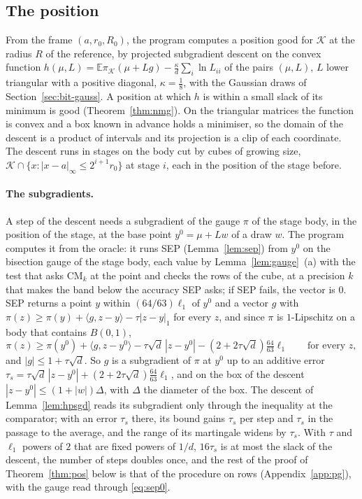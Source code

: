 \documentclass[11pt]{amsart}
\theoremstyle{definition}
\numberwithin{equation}{section}
\newcommand{\E}{\mathbb{E}}
\newcommand{\cK}{\mathcal{K}}
\newcommand{\ip}[1]{\langle #1\rangle}
\begin{document}
\subsection{The position}\label{sec:bit-pos}

From the frame $(a,r_0,R_0)$, the program computes a position good for $\cK$ at the radius $R$ of the reference, by projected subgradient descent on the convex function $h(\mu,L)=\E\pi_\cK(\mu+Lg)-\frac\kappa d\sum_i\ln L_{ii}$ of the pairs $(\mu,L)$, $L$ lower triangular with a positive diagonal, $\kappa=\frac18$, with the Gaussian draws of Section~\ref{sec:bit-gauss}. A position at which $h$ is within a small slack of its minimum is good (Theorem~\ref{thm:nmg}). On the triangular matrices the function is convex and a box known in advance holds a minimiser, so the domain of the descent is a product of intervals and its projection is a clip of each coordinate. The descent runs in stages on the body cut by cubes of growing size, $\cK\cap\{x:|x-a|_\infty\le2^{i+1}r_0\}$ at stage $i$, each in the position of the stage before.

\paragraph{The subgradients.} A step of the descent needs a subgradient of the gauge $\pi$ of the stage body, in the position of the stage, at the base point $y^0=\mu+Lw$ of a draw $w$. The program computes it from the oracle: it runs SEP (Lemma~\ref{lem:sep}) from $y^0$ on the bisection gauge of the stage body, each value by Lemma~\ref{lem:gauge}~(a) with the test that asks $\mathrm{CM}_k$ at the point and checks the rows of the cube, at a precision $k$ that makes the band below the accuracy SEP asks; if SEP fails, the vector is $0$. SEP returns a point $y$ within $(64/63)\ell_1$ of $y^0$ and a vector $g$ with $\pi(z)\ge\pi(y)+\ip{g,z-y}-\tau|z-y|_1$ for every $z$, and since $\pi$ is $1$-Lipschitz on a body that contains $B(0,1)$,
\begin{equation}\label{eq:sep0}
\pi(z)\ge\pi(y^0)+\ip{g,z-y^0}-\tau\sqrt d\,|z-y^0|-(2+2\tau\sqrt d)\tfrac{64}{63}\ell_1\qquad\text{for every }z,
\end{equation}
and $|g|\le1+\tau\sqrt d$.
So $g$ is a subgradient of $\pi$ at $y^0$ up to an additive error $\tau_s=\tau\sqrt d\,|z-y^0|+(2+2\tau\sqrt d)\frac{64}{63}\ell_1$, and on the box of the descent $|z-y^0|\le(1+|w|)\Delta$, with $\Delta$ the diameter of the box. The descent of Lemma~\ref{lem:hpsgd} reads its subgradient only through the inequality at the comparator; with an error $\tau_s$ there, its bound gains $\tau_s$ per step and $\tau_s$ in the passage to the average, and the range of its martingale widens by $\tau_s$. With $\tau$ and $\ell_1$ powers of $2$ that are fixed powers of $1/d$, $16\tau_s$ is at most the slack of the descent, the number of steps doubles once, and the rest of the proof of Theorem~\ref{thm:pos} below is that of the procedure on rows (Appendix~\ref{app:pg}), with the gauge read through \eqref{eq:sep0}.
\end{document}
